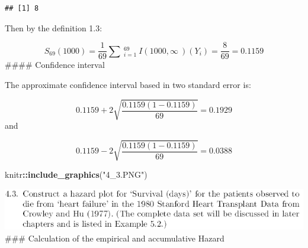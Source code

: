 \documentclass[
]{article}
\newenvironment{Shaded}{\begin{snugshade}}{\end{snugshade}}
\newcommand{\KeywordTok}[1]{\textcolor[rgb]{0.13,0.29,0.53}{\textbf{#1}}}
\newcommand{\NormalTok}[1]{#1}
\newcommand{\OperatorTok}[1]{\textcolor[rgb]{0.81,0.36,0.00}{\textbf{#1}}}
\newcommand{\StringTok}[1]{\textcolor[rgb]{0.31,0.60,0.02}{#1}}
\begin{document}
\begin{verbatim}
## [1] 8
\end{verbatim}

Then by the definition 1.3:

\[S_{69}\left(1000\right)=\frac{1}{69}\sum \:_{i=1}^{69}\:I\left(1000,\infty \:\right)\left(Y_i\right)=\frac{8}{69}=0.1159\]
\#\#\#\# Confidence interval

The approximate confidence interval based in two standard error is:

\[0.1159+2\sqrt{\frac{0.1159\left(1-0.1159\right)}{69}}=0.1929\] and

\[0.1159-2\sqrt{\frac{0.1159\left(1-0.1159\right)}{69}}=0.0388\]

\begin{Shaded}
\begin{Highlighting}[]
\NormalTok{knitr}\OperatorTok{::}\KeywordTok{include_graphics}\NormalTok{(}\StringTok{"4_3.PNG"}\NormalTok{)}
\end{Highlighting}
\end{Shaded}

\includegraphics[width=9.24in]{4_3} \#\#\# Calculation of the empirical
and accumulative Hazard
\end{document}
